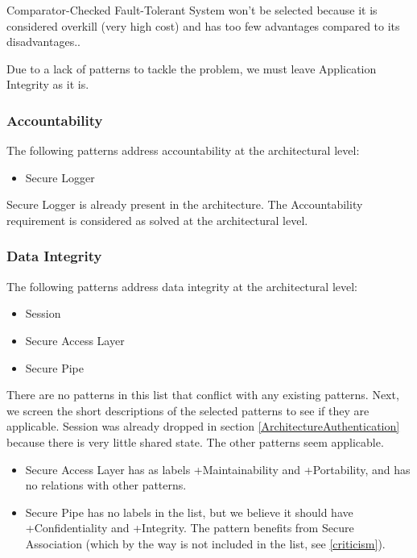 \documentclass[a4paper,11pt]{report}
\begin{document}
Comparator-Checked Fault-Tolerant System won't be selected because it is considered overkill (very high cost) and has too few
advantages compared to its disadvantages..

Due to a lack of patterns to tackle the problem, we must leave Application Integrity as it is.

\subsubsection{Accountability}

The following patterns address accountability at the architectural level:

\begin{itemize}
\item Secure Logger
\end{itemize}
Secure Logger is already present in the architecture. The Accountability requirement is considered as solved at the architectural level.

\subsubsection{Data Integrity}
The following patterns address data integrity at the architectural level:
\begin{itemize}
\item Session
\item Secure Access Layer
\item Secure Pipe
\end{itemize}

There are no patterns in this list that conflict with any existing patterns.
Next, we screen the short descriptions of the selected patterns to see if they are applicable. Session was already dropped in section \ref{ArchitectureAuthentication} because 
there is very little shared state. The other patterns seem
applicable.

\begin{itemize}
\item Secure Access Layer has as labels +Maintainability and +Portability, and has no relations with other patterns.

\item Secure Pipe has no labels in the list, but we believe it should have +Confidentiality and +Integrity. The pattern
benefits from Secure Association (which by the way is not included in the list, see \ref{criticism}).
\end{itemize}
\end{document}
